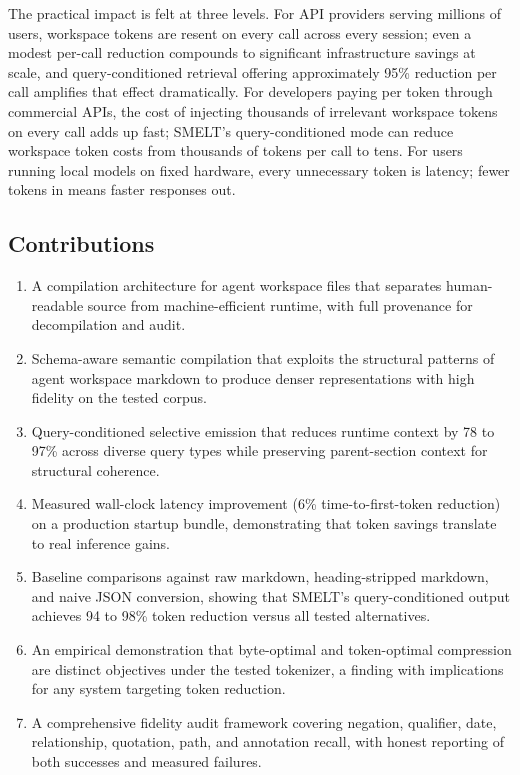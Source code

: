 \documentclass[11pt,a4paper]{article}
\begin{document}
The practical impact is felt at three levels. For API providers serving millions of users, workspace tokens are resent on every call across every session; even a modest per-call reduction compounds to significant infrastructure savings at scale, and query-conditioned retrieval offering approximately 95\% reduction per call amplifies that effect dramatically. For developers paying per token through commercial APIs, the cost of injecting thousands of irrelevant workspace tokens on every call adds up fast; SMELT's query-conditioned mode can reduce workspace token costs from thousands of tokens per call to tens. For users running local models on fixed hardware, every unnecessary token is latency; fewer tokens in means faster responses out.

\subsection{Contributions}

\begin{enumerate}
    \item A compilation architecture for agent workspace files that separates human-readable source from machine-efficient runtime, with full provenance for decompilation and audit.
    \item Schema-aware semantic compilation that exploits the structural patterns of agent workspace markdown to produce denser representations with high fidelity on the tested corpus.
    \item Query-conditioned selective emission that reduces runtime context by 78 to 97\% across diverse query types while preserving parent-section context for structural coherence.
    \item Measured wall-clock latency improvement (6\% time-to-first-token reduction) on a production startup bundle, demonstrating that token savings translate to real inference gains.
    \item Baseline comparisons against raw markdown, heading-stripped markdown, and naive JSON conversion, showing that SMELT's query-conditioned output achieves 94 to 98\% token reduction versus all tested alternatives.
    \item An empirical demonstration that byte-optimal and token-optimal compression are distinct objectives under the tested tokenizer, a finding with implications for any system targeting token reduction.
    \item A comprehensive fidelity audit framework covering negation, qualifier, date, relationship, quotation, path, and annotation recall, with honest reporting of both successes and measured failures.
\end{enumerate}
\end{document}
